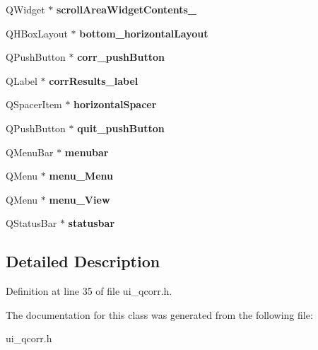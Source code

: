 \begin{DoxyCompactItemize}
\item 
\hypertarget{classUi__QcorrClass_abf4b50d1ea6274629f687ac66ce12e80}{
QWidget $\ast$ {\bfseries scrollAreaWidgetContents\_}}
\label{classUi__QcorrClass_abf4b50d1ea6274629f687ac66ce12e80}

\item 
\hypertarget{classUi__QcorrClass_aa4247652a1ed71c6b6704aa3273544bd}{
QHBoxLayout $\ast$ {\bfseries bottom\_\-horizontalLayout}}
\label{classUi__QcorrClass_aa4247652a1ed71c6b6704aa3273544bd}

\item 
\hypertarget{classUi__QcorrClass_a06bd40ad7db57a5438d16e5d5061df42}{
QPushButton $\ast$ {\bfseries corr\_\-pushButton}}
\label{classUi__QcorrClass_a06bd40ad7db57a5438d16e5d5061df42}

\item 
\hypertarget{classUi__QcorrClass_a4ddf4aae819f6b25476a5a3e76c600d7}{
QLabel $\ast$ {\bfseries corrResults\_\-label}}
\label{classUi__QcorrClass_a4ddf4aae819f6b25476a5a3e76c600d7}

\item 
\hypertarget{classUi__QcorrClass_a80762eea1a44f16ceffed065d0459a69}{
QSpacerItem $\ast$ {\bfseries horizontalSpacer}}
\label{classUi__QcorrClass_a80762eea1a44f16ceffed065d0459a69}

\item 
\hypertarget{classUi__QcorrClass_ad032c2f5b8f1aed8decad689900d7017}{
QPushButton $\ast$ {\bfseries quit\_\-pushButton}}
\label{classUi__QcorrClass_ad032c2f5b8f1aed8decad689900d7017}

\item 
\hypertarget{classUi__QcorrClass_a8567acdc882322bab775dd04569433da}{
QMenuBar $\ast$ {\bfseries menubar}}
\label{classUi__QcorrClass_a8567acdc882322bab775dd04569433da}

\item 
\hypertarget{classUi__QcorrClass_a1d52a371f0d1e29cdf70d1be2a85a45e}{
QMenu $\ast$ {\bfseries menu\_\-Menu}}
\label{classUi__QcorrClass_a1d52a371f0d1e29cdf70d1be2a85a45e}

\item 
\hypertarget{classUi__QcorrClass_a8c1dd90b9ea2130b6fe6e8e6553fbf13}{
QMenu $\ast$ {\bfseries menu\_\-View}}
\label{classUi__QcorrClass_a8c1dd90b9ea2130b6fe6e8e6553fbf13}

\item 
\hypertarget{classUi__QcorrClass_ae220680c312c600f015f0413ad6cd2cf}{
QStatusBar $\ast$ {\bfseries statusbar}}
\label{classUi__QcorrClass_ae220680c312c600f015f0413ad6cd2cf}

\end{DoxyCompactItemize}


\subsection{Detailed Description}


Definition at line 35 of file ui\_\-qcorr.h.

The documentation for this class was generated from the following file:\begin{DoxyCompactItemize}
\item 
ui\_\-qcorr.h\end{DoxyCompactItemize}
